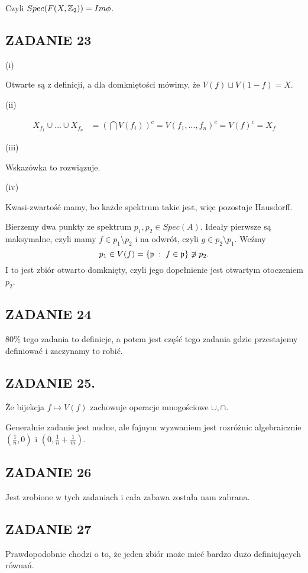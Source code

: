\documentclass{article}
\begin{document}
Czyli $Spec(F(X, \mathbb{Z}_2))=Im\phi$.

\subsection*{ZADANIE 23}
(i)

Otwarte są z definicji, a dla domkniętości mówimy, że $V(f)\sqcup V(1-f)=X$.

(ii)

\begin{align*}
X_{f_1}\cup...\cup X_{f_n}&=\left(\bigcap V(f_i)\right)^c=V(f_1,...,f_n)^c=V(f)^c=X_f
\end{align*}

(iii)

Wskazówka to rozwiązuje.

(iv)

Kwasi-zwartość mamy, bo każde spektrum takie jest, więc pozostaje Hausdorff.

Bierzemy dwa punkty ze spektrum $p_1,p_2\in Spec(A)$. Ideały pierwsze są maksymalne, czyli mamy $f\in p_1\setminus p_2$ i na odwrót, czyli $g\in p_2\setminus p_1$. Weźmy 
$$p_1\in V(f)=\{\mathfrak{p}\;:\;f\in\mathfrak{p}\}\not\ni p_2.$$ 
I to jest zbiór otwarto domknięty, czyli jego dopełnienie jest otwartym otoczeniem $p_2$.

\subsection*{ZADANIE 24}
80$\%$ tego zadania to definicje, a potem jest część tego zadania gdzie przestajemy definiować i zaczynamy to robić.

\subsection*{ZADANIE 25.}
Że bijekcja $f\mapsto V(f)$ zachowuje operacje mnogościowe $\cup,\cap$.

Generalnie zadanie jest nudne, ale fajnym wyzwaniem jest rozróżnic algebraicznie $(\frac1n,0)$ i $(0, \frac1n+\frac1m)$.

\subsection*{ZADANIE 26}
Jest zrobione w tych zadaniach i cała zabawa została nam zabrana.

\subsection*{ZADANIE 27}
Prawdopodobnie chodzi o to, że jeden zbiór może mieć bardzo dużo definiujących równań.
\end{document}
